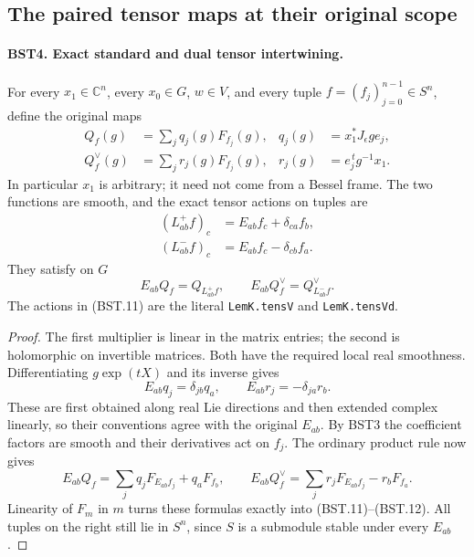 \documentclass[11pt,a4paper]{article}
\numberwithin{equation}{section}
\theoremstyle{remark}\newtheorem{remark}[theorem]{Remark}
\begin{document}
\subsection{The paired tensor maps at their original scope}

\paragraph{BST4. Exact standard and dual tensor intertwining.}
\label{claim:BST4}
For every $x_1\in\mathbb C^n$, every $x_0\in G$, $w\in V$, and
every tuple $f=(f_j)_{j=0}^{n-1}\in S^n$, define the original maps
\[
 \begin{aligned}
 Q_f(g)&=\sum_j q_j(g)F_{f_j}(g),
       &q_j(g)&=x_1^*J_\epsilon ge_j,\\
 Q_f^\vee(g)&=\sum_j r_j(g)F_{f_j}(g),
       &r_j(g)&=e_j^{\,t}g^{-1}x_1.
 \end{aligned}
 \tag{BST.10}
\]
In particular $x_1$ is arbitrary; it need not come from a Bessel frame.
The two functions are smooth, and the exact tensor actions on tuples are
\[
 \begin{split}
 (L_{ab}^{+}f)_c&=E_{ab}f_c+\delta_{ca}f_b,\\
 (L_{ab}^{-}f)_c&=E_{ab}f_c-\delta_{cb}f_a.
 \end{split}
 \tag{BST.11}
\]
They satisfy on $G$
\[
                  E_{ab}Q_f=Q_{L_{ab}^{+}f},
 \qquad E_{ab}Q_f^\vee=Q_{L_{ab}^{-}f}^\vee .
 \tag{BST.12}
\]
The actions in (BST.11) are the literal \texttt{Lem\allowbreak K.\allowbreak tens\allowbreak V}
and \texttt{Lem\allowbreak K.\allowbreak tens\allowbreak Vd}.

\begin{proof}
The first multiplier is linear in the matrix entries; the second is
holomorphic on invertible matrices.  Both have the required local
real smoothness.  Differentiating $g\exp(tX)$ and its inverse gives
\[
 E_{ab}q_j=\delta_{jb}q_a,\qquad
 E_{ab}r_j=-\delta_{ja}r_b.
 \tag{BST.13}
\]
These are first obtained along real Lie directions and then extended
complex linearly, so their conventions agree with the original
$E_{ab}$.  By BST3 the coefficient factors are smooth and their
derivatives act on $f_j$.
The ordinary product rule now gives
\[
 E_{ab}Q_f=\sum_jq_jF_{E_{ab}f_j}+q_aF_{f_b},\qquad
 E_{ab}Q_f^\vee=\sum_jr_jF_{E_{ab}f_j}-r_bF_{f_a}.
 \tag{BST.14}
\]
Linearity of $F_m$ in $m$ turns these formulas exactly into
(BST.11)--(BST.12).  All tuples on the right still lie in $S^n$,
since $S$ is a submodule stable under every $E_{ab}$.
\end{proof}
\end{document}
